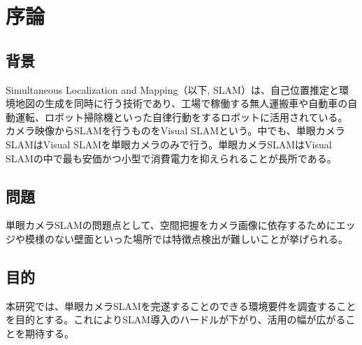 \chapter{序論}

\section{背景}

Simultaneous Localization and Mapping（以下, SLAM）は、自己位置推定と環境地図の生成を同時に行う技術であり、工場で稼働する無人運搬車や自動車の自動運転、ロボット掃除機といった自律行動をするロボットに活用されている。
カメラ映像からSLAMを行うものをVisual SLAMという。中でも、単眼カメラSLAMはVisual SLAMを単眼カメラのみで行う。単眼カメラSLAMはVisual SLAMの中で最も安価かつ小型で消費電力を抑えられることが長所である。

\section{問題}

単眼カメラSLAMの問題点として、空間把握をカメラ画像に依存するためにエッジや模様のない壁面といった場所では特徴点検出が難しいことが挙げられる。

\section{目的}

本研究では、単眼カメラSLAMを完遂することのできる環境要件を調査することを目的とする。これによりSLAM導入のハードルが下がり、活用の幅が広がることを期待する。

%
